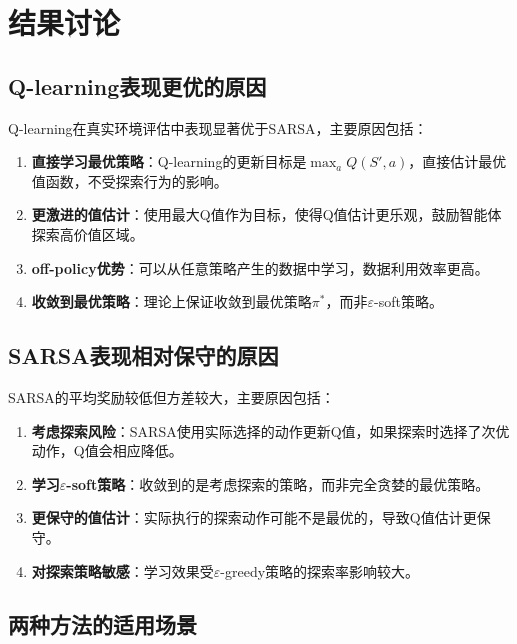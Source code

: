 \documentclass[12pt,a4paper]{article}
\begin{document}
\section{结果讨论}

\subsection{Q-learning表现更优的原因}

Q-learning在真实环境评估中表现显著优于SARSA，主要原因包括：

\begin{enumerate}
    \item \textbf{直接学习最优策略}：Q-learning的更新目标是$\max_a Q(S', a)$，直接估计最优值函数，不受探索行为的影响。
    
    \item \textbf{更激进的值估计}：使用最大Q值作为目标，使得Q值估计更乐观，鼓励智能体探索高价值区域。
    
    \item \textbf{off-policy优势}：可以从任意策略产生的数据中学习，数据利用效率更高。
    
    \item \textbf{收敛到最优策略}：理论上保证收敛到最优策略$\pi^*$，而非$\varepsilon$-soft策略。
\end{enumerate}

\subsection{SARSA表现相对保守的原因}

SARSA的平均奖励较低但方差较大，主要原因包括：

\begin{enumerate}
    \item \textbf{考虑探索风险}：SARSA使用实际选择的动作更新Q值，如果探索时选择了次优动作，Q值会相应降低。
    
    \item \textbf{学习$\varepsilon$-soft策略}：收敛到的是考虑探索的策略，而非完全贪婪的最优策略。
    
    \item \textbf{更保守的值估计}：实际执行的探索动作可能不是最优的，导致Q值估计更保守。
    
    \item \textbf{对探索策略敏感}：学习效果受$\varepsilon$-greedy策略的探索率影响较大。
\end{enumerate}

\subsection{两种方法的适用场景}
\end{document}
